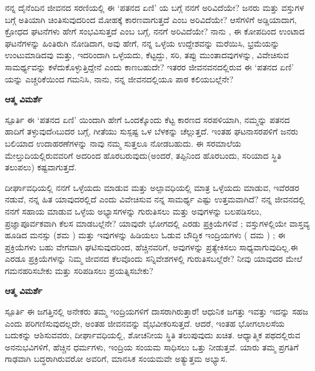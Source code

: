 \newpage
\begin{mananam}{}
\footnotesize \mananamtext ನನ್ನ ದೈನೆಂದಿನ ಜೀವನದ ಸರಣಿಯಲ್ಲಿ ಈ ‘ಪತನದ ಏಣಿ’ ಯ  ಬಗ್ಗೆ ನನಗೆ ಅರಿವಿದೆಯೇ? ಜನರು ಮತ್ತು ವಸ್ತುಗಳ ಬಗ್ಗೆ ಅತಿಯಾಗಿ ಚಿಂತಿಸುವುದರಿಂದ ಮೋಹಕ್ಕೆ ಕಾರಣವಾಗುತ್ತದೆ ಎಂಬ ಅರಿವಿದೆಯೇ? ಆಸೆಗಳಿಗೆ  ಅಡ್ಡಿಯಾದಾಗ, ಕ್ರೋಧದ ಘಟನೆಗಳು ಹೇಗೆ ಸಂಭವಿಸುತ್ತದೆ ಎಂಬ ಬಗ್ಗೆ, ನನಗೆ ಅರಿವಿದೆಯೇ? ನಾನು , ಈ ಕೋಪದಿಂದ ಉಂಟಾದ ಘಟನೆಗಳನ್ನು ಹಿಂತಿರುಗಿ ನೋಡಿದಾಗ,  ಅವು ಹೇಗೆ, ನನ್ನ ಒಳ್ಳೆಯ ಉದ್ದೇಶವನ್ನು ಮರೆಯಿಸಿ,  ಭ್ರಮೆಯನ್ನು ಉಂಟುಮಾಡಿದವು ಮತ್ತು,  ಇದರಿಂದಾಗಿ ಒಳ್ಳೆಯದು, ಕೆಟ್ಟದ್ದು, ಸರಿ, ತಪ್ಪು ಮುಂತಾದವುಗಳನ್ನು, ವಿವೇಚಿಸುವ ಸಾಮರ್ಥ್ಯವನ್ನು ಕಳೆದುಕೊಳ್ಳುತ್ತಿದ್ದೇನೆ ಎಂದು ಕಾಣಬಹುದೇ?  ಇತರರ ಜೀವನವನದಲ್ಲಿರುವ ಈ ‘ಪತನದ ಏಣಿ’ ಯನ್ನು ಎಚ್ಚರಿಕೆಯಿಂದ ಗಮನಿಸಿ, ನಾನು, ನನ್ನ ಜೀವನದಲ್ಲಿಯೂ ಪಾಠ ಕಲಿಯಬಲ್ಲೆನೇ?
\end{mananam}
\WritingHand\enspace\textbf{ಆತ್ಮ ವಿಮರ್ಶೆ}
\begin{inspiration}{\mananamfont ಸ್ಪೂರ್ತಿ}
\footnotesize \mananamtext ಈ ‘ಪತನದ ಏಣಿ’ ಯಿಂದಾಗಿ ಹೇಗೆ ಒಂದಕ್ಕೊಂದು ಕೆಟ್ಟ ಕಾರಣದ ಸರಪಳಿಯಾಗಿ, ನಮ್ಮನ್ನು ಪತನದ ಹಾದಿಗೆ ತಳ್ಳುವುದೆoಬುದರ ಬಗ್ಗೆ, ಗೀತೆಯು ಸುಸ್ಪಷ್ಟ ಒಳ ಬೆಳಕನ್ನು ಚೆಲ್ಲುತ್ತದೆ. ಇಂತಹ ಘಟನಾಸರಪಳಿಗೆ  ಜನರು ಬಲಿಯಾದ ಉದಾಹರಣೆಗಳನ್ನು ನಾವು ನಮ್ಮ ಸುತ್ತಲೂ ನೋಡಬಹುದು. ಈ ಸರಮಾಲೆಯ ಮೇಲ್ತುದಿಯಲ್ಲಿರುವವರಿಗೆ ಅದರಿಂದ ಹೊರಬರುವುದು(ಅಂದರೆ, ತಪ್ಪಿನಿಂದ ಹೊರಬಂದು, ಸರಿಯಾದ ಸ್ಥಿತಿ ತಲುಪಲು) ಕಷ್ಟವಾಗುತ್ತದೆ. 
\end{inspiration}
\newpage

\begin{mananam}{}
\footnotesize \mananamtext ದೀರ್ಘಾವಧಿಯಲ್ಲಿ ನನಗೆ ಒಳ್ಳೆಯದು ಮಾಡುವ ಮತ್ತು ಅಲ್ಪಾವಧಿಯಲ್ಲಿ ಮಾತ್ರ ಒಳ್ಳೆಯದು ಮಾಡುವ,  ಇವೆರಡರ ನಡುವೆ, ನನ್ನ ಹಿತ ಯಾವುದರಲ್ಲಿದೆ ಎಂದು ವಿವೇಚಿಸುವ ನನ್ನ ಸಾಮರ್ಥ್ಯ ಎಷ್ಟು ಉತ್ತಮವಾಗಿದೆ? ನನ್ನ ಜೀವನದಲ್ಲಿ ನನಗೆ ಸಹಾಯ ಮಾಡುವ ಒಳ್ಳೆಯ ಅಭ್ಯಾಸಗಳನ್ನು ಗುರುತಿಸಲು ಮತ್ತು ಅವುಗಳನ್ನು ಬಲಪಡಿಸಲು,  ಪ್ರಜ್ಞಾಪೂರ್ವಕವಾಗಿ ಕೆಲಸ ಮಾಡಬಲ್ಲೆನೇ? 
 ಯಾವುದೇ ಭೋಗದಲ್ಲಿ ಎರಡು ಪ್ರಕ್ರಿಯೆಗಳಿವೆ ; ವಸ್ತುಗಳಲ್ಲಿಯೇ ವಾಸ್ತವ್ಯ ಹೂಡಿದ  ಮನಸ್ಸು (ಶಮ ) ಮತ್ತು ಇವುಗಳನ್ನು ಹಿಡಿಯಲು ಓಡುವ  ಬೌದ್ಧಿಕ ಇಂದ್ರಿಯಗಳು ( ದಮ ) ; ಈ ಪ್ರಕ್ರಿಯೆಗಳು ಬಹು ವೇಗವಾಗಿ ಘಟಿಸುವುದರಿಂದ, ಹೆಚ್ಚಿನವರಿಗೆ, ಅವುಗಳನ್ನು ಪ್ರತ್ಯೇಕಿಸಲು ಸಾಧ್ಯವಾಗುವುದಿಲ್ಲ.ಈ ಎರಡೂ ಪ್ರಕ್ರಿಯೆಗಳನ್ನು ನಿಮ್ಮ ಜೀವನದ ಕೆಲವೊಂದು ಸನ್ನಿವೇಶಗಳಲ್ಲಿ ಗುರುತಿಸಬಲ್ಲೆರೇ? ನೀವು ಯಾವುದರ ಮೇಲೆ ಗಮನಹರಿಸಬೇಕು ಮತ್ತು ಸರಿಪಡಿಸಲು ಪ್ರಯತ್ನಿಸಬೇಕು?
\end{mananam}
\WritingHand\enspace\textbf{ಆತ್ಮ ವಿಮರ್ಶೆ}
\begin{inspiration}{\mananamfont ಸ್ಪೂರ್ತಿ}
\footnotesize \mananamtext ಈ ಜಗತ್ತಿನಲ್ಲಿ ಅನೇಕರು ತಮ್ಮ ಇಂದ್ರಿಯಗಳಿಗೆ ದಾಸರಾಗಿರುತ್ತಾರೆ! ಆಧುನಿಕ ಜಗತ್ತು ಇವತ್ತು ಇದನ್ನು ಸಹಜ ಎಂದು ಪರಿಗಣಿಸುವುದಲ್ಲದೇ, ಅಂತಹ ಜೀವನವನ್ನು ವೈಭವೀಕರಿಸುತ್ತದೆ. ಆದರೆ, ಇಂತಹ ಭೋಗಲಾಲಸೆಯ ಬದುಕನ್ನು ಆಶಿಸುವವರು, ದೀರ್ಘಾವಧಿಯಲ್ಲಿ, ಶೋಚನೀಯ ಸ್ಥಿತಿ ತಲುಪುವುದು ಖಚಿತ. ಆಧ್ಯಾತ್ಮಿಕ ಪಥದಲ್ಲಿರುವ ಅನನುಭವಿಗಳಿಗೆ, ಹೆಚ್ಚಿನ ಧರ್ಮಗಳು, ಇಂದ್ರಿಯ ಸಂಯಮ ಸಾಧಿಸಲು ಒತ್ತು ನೀಡುತ್ತವೆ. ಯಾರು ತಮ್ಮ ಪ್ರಗತಿಗೆ ಗಾಢವಾಗಿ ಬದ್ಧರಾಗಿರುವರೋ ಅವರಿಗೆ, ಮಾನಸಿಕ ಸಂಯಮವೇ ಅತ್ಯುತ್ತಮ ಅಭ್ಯಾಸ.
\end{inspiration}
\newpage

